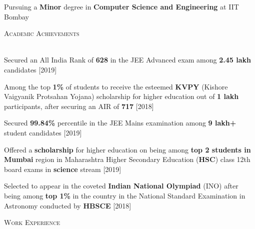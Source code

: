 \documentclass[12pt]{article}
\renewcommand{\section}[1]{
    \vspace*{10pt}
    \textsc{\Large{#1}}
    \vspace*{-10pt} \\ \hspace*{-5pt} 
    \hrulefill \\
    \vspace*{-15pt}
}
\newcommand{\smallbullet}{
    \small$\bullet$
}
\newenvironment{bullet-list-major}{
    \begin{list}{
        \smallbullet
    }{
        \setlength\leftmargin{15pt}\topsep 0pt \itemsep -4pt
    }
} {
    \end{list}
}
\begin{document}
    \vspace*{48.63mm}



    \vspace{-20pt}
    Pursuing a \textbf{Minor} degree in \textbf{Computer Science and Engineering} at IIT Bombay
    \vspace{-10pt}

    \section{Academic Achievements}
    \begin{bullet-list-major}
        \item Secured an All India Rank of \textbf{628} in the JEE Advanced exam among \textbf{2.45 lakh} candidates \hfill [2019]
        \item Among the top \textbf{1\%} of students to receive the esteemed \textbf{KVPY} (Kishore Vaigyanik Protsahan Yojana)
        scholarship for higher education out of \textbf{1 lakh} participants, after securing an AIR of \textbf{717}  \hfill [2018]
        \item Secured \textbf{99.84\%} percentile in the JEE Mains examination among \textbf{9 lakh+} student candidates \hfill [2019]
        \item Offered a \textbf{scholarship} for higher education on being among \textbf{top 2 students in Mumbai} region in
        Maharashtra Higher Secondary Education (\textbf{HSC}) class 12th board exams in \textbf{science} stream   \hfill [2019]
        \item Selected to appear in the coveted \textbf{Indian National Olympiad} (INO) after being among \textbf{top 1\%}
        in the country in the National Standard Examination in Astronomy conducted by \textbf{HBSCE}   \hfill [2018]
    \end{bullet-list-major}


    \section{Work Experience}
\end{document}
